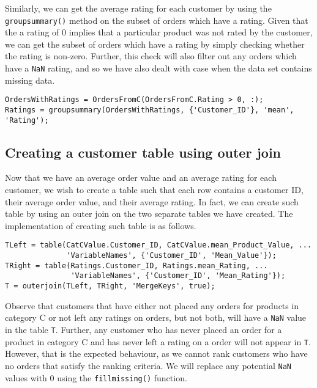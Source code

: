 \noindent
Similarly, we can get the average rating for each customer by using the \lstinline|groupsummary()| method on the subset of orders which have a rating. Given that the a rating of 0 implies that a particular product was not rated by the customer, we can get the subset of orders which have a rating by simply checking whether the rating is non-zero. Further, this check will also filter out any orders which have a \lstinline|NaN| rating, and so we have also dealt with case when the data set contains missing data.

\begin{lstlisting}
OrdersWithRatings = OrdersFromC(OrdersFromC.Rating > 0, :);
Ratings = groupsummary(OrdersWithRatings, {'Customer_ID'}, 'mean', 'Rating');
\end{lstlisting}

\newpage
\subsection{Creating a customer table using outer join}
Now that we have an average order value and an average rating for each customer, we wish to create a table such that each row contains a customer ID, their average order value, and their average rating. In fact, we can create such table by using an outer join on the two separate tables we have created. The implementation of creating such table is as follows.


\begin{lstlisting}
TLeft = table(CatCValue.Customer_ID, CatCValue.mean_Product_Value, ...
              'VariableNames', {'Customer_ID', 'Mean_Value'});
TRight = table(Ratings.Customer_ID, Ratings.mean_Rating, ...
               'VariableNames', {'Customer_ID', 'Mean_Rating'});
T = outerjoin(TLeft, TRight, 'MergeKeys', true);
\end{lstlisting}

\noindent
Observe that customers that have either not placed any orders for products in category C or not left any ratings on orders, but not both, will have a \lstinline|NaN| value in the table \lstinline|T|. Further, any customer who has never placed an order for a product in category C and has never left a rating on a order will not appear in \lstinline|T|. However, that is the expected behaviour, as we cannot rank customers who have no orders that satisfy the ranking criteria. We will replace any potential \lstinline|NaN| values with 0 using the \lstinline|fillmissing()| function.

